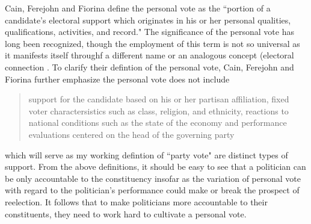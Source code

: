 \documentclass{article}
\begin{document}
			Cain, Ferejohn and Fiorina
			\autocite*{cainPersonalVoteConstituency1987}
			define the personal vote as the ``portion of a candidate's electoral support which originates in his or her
			personal qualities,
			qualifications,
			activities,
			and record." 
			\autocite*[9]{cainPersonalVoteConstituency1987}
			The significance of the personal vote has long been recognized,
			though the employment of this term is not so universal as it manifests itself throughf a different name or an analogous concept
			(electoral connection
			\autocites[home style][]
			{fennoHomeStyleHouse1978}
			[electoral connection][]
			{mayhewCongressElectoralConnection1974}
			[personal reputation][]
			{careyIncentivesCultivatePersonal1995}
			[local vote][]
			{pattieWinningLocalVote1995}.
			To clarify their defintion of the personal vote,
			Cain, Ferejohn and Fiorina
			\autocite*[9]{cainPersonalVoteConstituency1987}
			further emphasize the personal vote does not include
			\begin{quotation}
				support for the candidate based on his or her partisan affiliation, fixed voter charactersistics such as class, religion, and ethnicity, reactions to national conditions such as the state of the economy and performance evaluations centered on the head of the governing party
			\end{quotation}
			which will serve as my working defintion of ``party vote" are distinct types of support.
			From the above definitions,
			it should be easy to see
			that a politician can be only accountable to the constituency
			insofar as the variation of personal vote
			with regard to the politician's performance
			could make or break the prospect of reelection.
			It follows that to make politicians more accountable to their constituents,
			they need to work hard to cultivate a personal vote.
			
\end{document}
